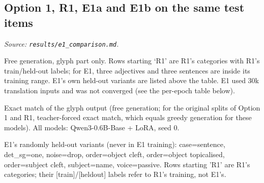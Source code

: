 \documentclass[10pt,a4paper,oneside]{article}
\begin{document}
\subsection{Option 1, R1, E1a and E1b on the same test items}
\textit{Source: \texttt{results/e1\_comparison.md}.}


\begin{caveat}Free generation, glyph part only. Rows starting `R1' are R1's categories with R1's train/held-out labels; for E1,
three adjectives and three sentences are inside its training range. E1's own held-out variants are listed above the
table. E1 used 30k translation inputs and was not converged (see the per-epoch table below).\end{caveat}
Exact match of the glyph output (free generation; for the original splits of Option 1 and R1, teacher-forced exact match, which equals greedy generation for these models). All models: Qwen3-0.6B-Base + LoRA, seed 0.

E1's randomly held-out variants (never in E1 training): case=sentence, det\_sg=one, noise=drop, order=object cleft, order=object topicalised, order=subject cleft, subject=name, voice=passive. Rows starting 'R1' are R1's categories; their [train]/[heldout] labels refer to R1's training, not E1's.
\end{document}
